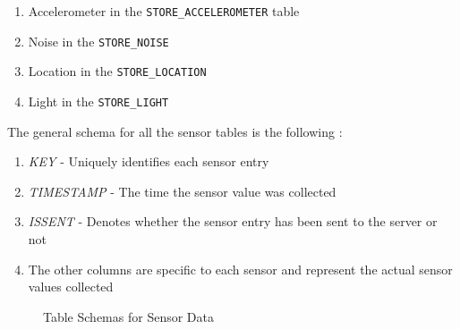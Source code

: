 \begin{enumerate}
	\item Accelerometer in the \texttt{STORE\_ACCELEROMETER} table
	\item Noise in the \texttt{STORE\_NOISE}
    \item Location in the  \texttt{STORE\_LOCATION}
    \item Light in the  \texttt{STORE\_LIGHT}
\end{enumerate}

The general schema for all the sensor tables is the following :

\begin{enumerate}
	\item \textit{KEY} - Uniquely identifies each sensor entry
	\item \textit{TIMESTAMP} - The time the sensor value was collected
    \item \textit{ISSENT} - Denotes whether the sensor entry has been sent to the server or not
    \item The other columns are specific to each sensor and represent the actual sensor values collected 
\end{enumerate}

\begin{figure}[htp]
\hspace{1em}
%
\caption{Table Schemas for Sensor Data}
\label{fig:ts2}
\end{figure}



